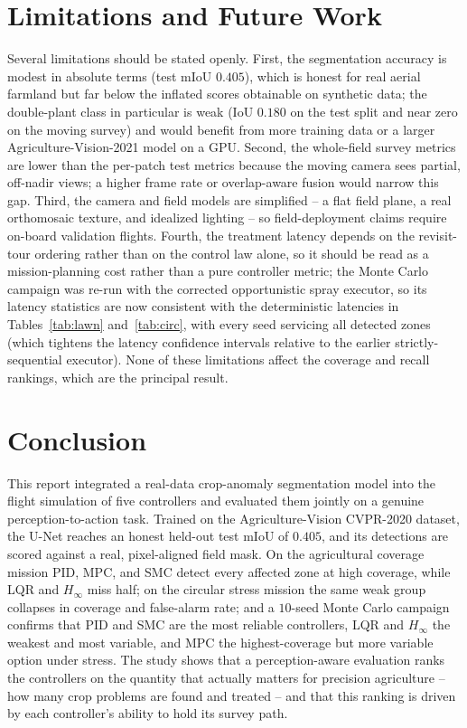 \documentclass[12pt,a4paper]{article}
\begin{document}
\section{Limitations and Future Work}\label{sec:limitations}
Several limitations should be stated openly. First, the segmentation accuracy is
modest in absolute terms (test mIoU $0.405$), which is honest for real aerial
farmland but far below the inflated scores obtainable on synthetic data; the
double-plant class in particular is weak (IoU $0.180$ on the test split and near zero
on the moving survey) and would benefit from more training data or a larger
Agriculture-Vision-2021 model on a GPU. Second, the whole-field survey metrics are
lower than the per-patch test metrics because the moving camera sees partial,
off-nadir views; a higher frame rate or overlap-aware fusion would narrow this gap.
Third, the camera and field models are simplified -- a flat field plane, a real
orthomosaic texture, and idealized lighting -- so field-deployment claims require
on-board validation flights. Fourth, the treatment latency depends on the revisit-tour
ordering rather than on the control law alone, so it should be read as a mission-planning
cost rather than a pure controller metric; the Monte Carlo campaign was re-run with the
corrected opportunistic spray executor, so its latency statistics are now consistent with
the deterministic latencies in Tables~\ref{tab:lawn} and~\ref{tab:circ}, with every seed
servicing all detected zones (which tightens the latency confidence intervals relative to
the earlier strictly-sequential executor). None of these limitations affect the coverage
and recall rankings, which are the principal result.

\section{Conclusion}\label{sec:conclusion}
This report integrated a real-data crop-anomaly segmentation model into the flight
simulation of five controllers and evaluated them jointly on a genuine
perception-to-action task. Trained on the Agriculture-Vision CVPR-2020 dataset, the
U-Net reaches an honest held-out test mIoU of $0.405$, and its detections are scored
against a real, pixel-aligned field mask. On the agricultural coverage mission PID,
MPC, and SMC detect every affected zone at high coverage, while LQR and $H_\infty$
miss half; on the circular stress mission the same weak group collapses in coverage
and false-alarm rate; and a $10$-seed Monte Carlo campaign confirms that PID and SMC
are the most reliable controllers, LQR and $H_\infty$ the weakest and most variable,
and MPC the highest-coverage but more variable option under stress. The study shows
that a perception-aware evaluation ranks the controllers on the quantity that
actually matters for precision agriculture -- how many crop problems are found and
treated -- and that this ranking is driven by each controller's ability to hold its
survey path.
\end{document}
